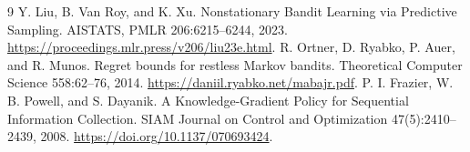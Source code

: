 \documentclass[11pt]{article}
\begin{document}
\begin{thebibliography}{9}
 Y. Liu, B. Van Roy, and K. Xu. Nonstationary Bandit Learning via Predictive Sampling. AISTATS, PMLR 206:6215--6244, 2023. \url{https://proceedings.mlr.press/v206/liu23e.html}.
 R. Ortner, D. Ryabko, P. Auer, and R. Munos. Regret bounds for restless Markov bandits. Theoretical Computer Science 558:62--76, 2014. \url{https://daniil.ryabko.net/mabajr.pdf}.
 P. I. Frazier, W. B. Powell, and S. Dayanik. A Knowledge-Gradient Policy for Sequential Information Collection. SIAM Journal on Control and Optimization 47(5):2410--2439, 2008. \url{https://doi.org/10.1137/070693424}.
\end{thebibliography}
\end{document}
